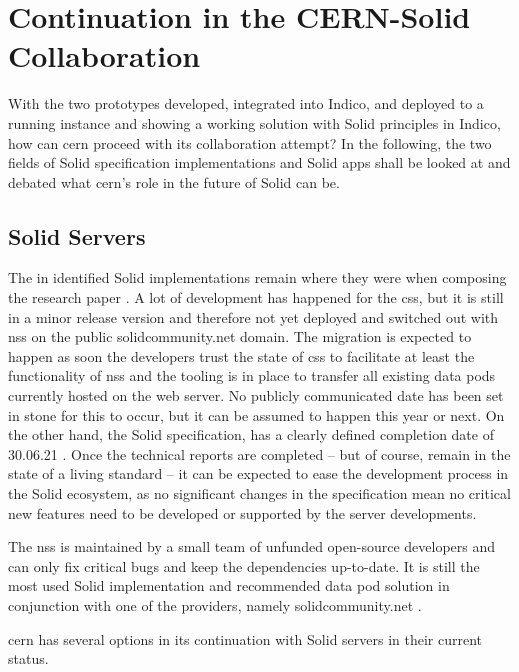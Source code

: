 \section{Continuation in the CERN-Solid Collaboration}

With the two prototypes developed, integrated into Indico, and deployed to a running instance and showing a working solution with Solid principles in Indico, how can \gls{cern} proceed with its collaboration attempt? In the following, the two fields of Solid specification implementations and Solid apps shall be looked at and debated what \gls{cern}'s role in the future of Solid can be.

\subsection{Solid Servers}

The in \cite{cern-solid-investigation-spec} identified Solid implementations remain where they were when composing the research paper \cite{cern-solid-investigation-spec}. A lot of development has happened for the \gls{css}, but it is still in a minor release version and therefore not yet deployed and switched out with \gls{nss} on the public solidcommunity.net domain. The migration is expected to happen as soon the developers trust the state of \gls{css} to facilitate at least the functionality of \gls{nss} and the tooling is in place to transfer all existing data pods currently hosted on the web server. No publicly communicated date has been set in stone for this to occur, but it can be assumed to happen this year or next. On the other hand, the Solid specification, has a clearly defined completion date of 30.06.21 \cite{solid-tr}. Once the technical reports are completed -- but of course, remain in the state of a living standard -- it can be expected to ease the development process in the Solid ecosystem, as no significant changes in the specification mean no critical new features need to be developed or supported by the server developments.

The \gls{nss} is maintained by a small team of unfunded open-source developers and can only fix critical bugs and keep the dependencies up-to-date. It is still the most used Solid implementation and recommended data pod solution in conjunction with one of the providers, namely solidcommunity.net \cite{solid-community}.

\gls{cern} has several options in its continuation with Solid servers in their current status.

